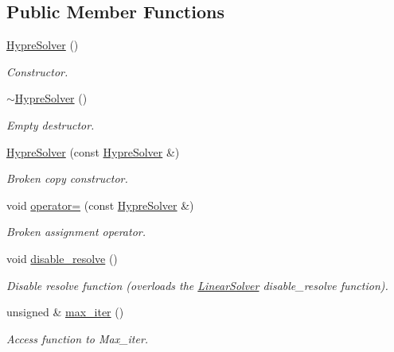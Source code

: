 \subsection*{Public Member Functions}
\begin{DoxyCompactItemize}
\item 
\hyperlink{classoomph_1_1HypreSolver_a69f39b6d9156643103fff1483c9c6e28}{Hypre\+Solver} ()
\begin{DoxyCompactList}\small\item\em Constructor. \end{DoxyCompactList}\item 
\hyperlink{classoomph_1_1HypreSolver_a48e1215b0c1cc088369fb78f5ca58b72}{$\sim$\+Hypre\+Solver} ()
\begin{DoxyCompactList}\small\item\em Empty destructor. \end{DoxyCompactList}\item 
\hyperlink{classoomph_1_1HypreSolver_acb24f66623db84815531ccd791107938}{Hypre\+Solver} (const \hyperlink{classoomph_1_1HypreSolver}{Hypre\+Solver} \&)
\begin{DoxyCompactList}\small\item\em Broken copy constructor. \end{DoxyCompactList}\item 
void \hyperlink{classoomph_1_1HypreSolver_aae31cbdfcc5d0cd99849f94537b8331b}{operator=} (const \hyperlink{classoomph_1_1HypreSolver}{Hypre\+Solver} \&)
\begin{DoxyCompactList}\small\item\em Broken assignment operator. \end{DoxyCompactList}\item 
void \hyperlink{classoomph_1_1HypreSolver_ae8949856fc75ff767f1ad940a710109f}{disable\+\_\+resolve} ()
\begin{DoxyCompactList}\small\item\em Disable resolve function (overloads the \hyperlink{classoomph_1_1LinearSolver}{Linear\+Solver} disable\+\_\+resolve function). \end{DoxyCompactList}\item 
unsigned \& \hyperlink{classoomph_1_1HypreSolver_a1bc71b4c84ca568da53deea0a4fd8db0}{max\+\_\+iter} ()
\begin{DoxyCompactList}\small\item\em Access function to Max\+\_\+iter. \end{DoxyCompactList}\item 

\end{DoxyCompactItemize}
